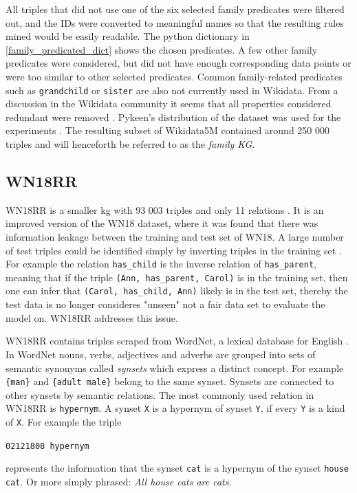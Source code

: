 All triples that did not use one of the six selected family predicates were filtered out, and the IDs were converted to meaningful names so that the resulting rules mined would be easily readable. The python dictionary in \cref{family_predicated_dict} shows the chosen predicates. A few other family predicates were considered, but did not have enough corresponding data points or were too similar to other selected predicates. Common family-related predicates such as \texttt{grandchild} or \texttt{sister} are also not currently used in Wikidata. From a discussion in the Wikidata community it seems that all properties considered redundant were removed \cite{kinship_discussion}. Pykeen's distribution of the dataset was used for the experiments \cite{ali2021pykeen}. The resulting subset of Wikidata5M contained around 250 000 triples and will henceforth be referred to as the \textit{family KG}.

\subsection{WN18RR}
WN18RR is a smaller \gls{kg} with 93 003 triples and only 11 relations \cite{dettmers2018convolutional}. It is an improved version of the WN18 dataset, where it was found that there was information leakage between the training and test set of WN18. A large number of test triples could be identified simply by inverting triples in the training set \cite{toutanova2015observed}. For example the relation \texttt{has\_child} is the inverse relation of \texttt{has\_parent}, meaning that if the triple \texttt{(Ann, has\_parent, Carol)} is in the training set, then one can infer that \texttt{(Carol, has\_child, Ann)} likely is in the test set, thereby the test data is no longer consideres "unseen" not a fair data set to evaluate the model on. WN18RR addresses this issue.

WN18RR contains triples scraped from WordNet, a lexical database for English \cite{wordNet}. In WordNet nouns, verbs, adjectives and adverbs are grouped into sets of semantic synonyms called
\textit{synsets} which express a distinct concept. For example \texttt{\{man\}} and \texttt{\{adult male\}} belong to the same synset. Synsets are connected to other synsets by semantic relations. The most commonly used relation in WN18RR is \texttt{hypernym}. A synset \texttt{X} is a hypernym of synset \texttt{Y}, if every \texttt{Y} is a kind of \texttt{X}. For example the triple 
\centerline{\texttt{02121808 \quad hypernym }}
represents the information that the synset \texttt{cat} is a hypernym of the synset \texttt{house cat}. Or more simply phrased: \textit{All house cats are cats}.


